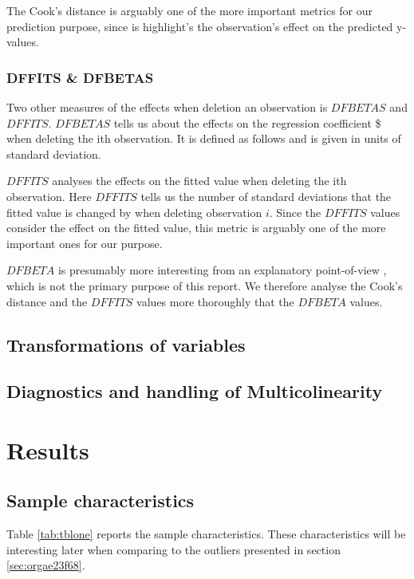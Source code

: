 \documentclass[11pt]{article}
\begin{document}
The Cook's distance is arguably one of the more important metrics for our prediction purpose, since is highlight's
the observation's effect on the predicted y-values. \cite{22286}

\subsubsection{DFFITS \& DFBETAS}
\label{sec:orgd509730}

Two other measures of the effects when deletion an observation is \(DFBETAS\) and \(DFFITS\). \(DFBETAS\) tells us
about the effects on the regression coefficient \$ when deleting the ith observation. It is defined as
follows and is given in units of standard deviation.

\(DFFITS\) analyses the effects on the fitted value when deleting the ith observation. Here \(DFFITS\) tells us
the number of standard deviations that the fitted value is changed by when deleting observation \(i\). Since 
the \(DFFITS\) values consider the effect on the fitted value, this metric is arguably one of the more important 
ones for our purpose.

\(DFBETA\) is presumably more interesting from an explanatory point-of-view \cite{22286}, which is not the
primary purpose of this report. We therefore analyse the Cook's distance and the \(DFFITS\) values more
thoroughly that the \(DFBETA\) values.

\subsection{Transformations of variables}
\label{sec:orga15790b}
\subsection{Diagnostics and handling of Multicolinearity}
\label{sec:org8b82377}
\newpage
\section{Results}
\label{sec:org61466a8}
\subsection{Sample characteristics}
\label{sec:org72696c0}

Table \ref{tab:tblone} reports the sample characteristics. These characteristics will be interesting later
when comparing to the outliers presented in section \ref{sec:orgae23f68}.
\end{document}

